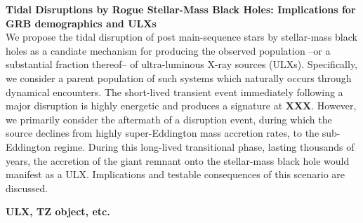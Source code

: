 {\bf Tidal Disruptions by Rogue Stellar-Mass Black Holes:  Implications for GRB demographics and ULXs}\\

We propose the tidal disruption of post main-sequence stars by stellar-mass black holes as a candiate mechanism for
producing the observed population --or a substantial fraction thereof-- of ultra-luminous X-ray sources (ULXs).   Specifically, we consider a parent population of such systems which naturally occurs through dynamical encounters.  The short-lived transient event immediately following a major disruption is highly energetic and produces a signature at {\bf XXX}.  However, we primarily consider the aftermath of a disruption event, during which the source declines from highly super-Eddington mass accretion rates, to the sub-Eddington regime.  During this long-lived transitional phase, lasting thousands of years, the accretion of the giant remnant onto the stellar-mass black hole would manifest as a ULX.   Implications and testable consequences of this scenario are discussed.


{\bf ULX, TZ object, etc.}

